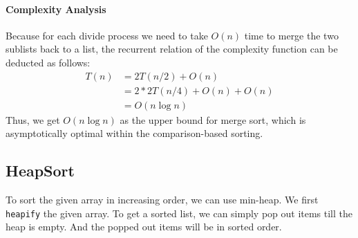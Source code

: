 \documentclass[../main.tex]{subfiles}
\begin{document}
\paragraph{Complexity Analysis} Because for each divide process we need to take $O(n)$ time to merge the two sublists back to a list, the recurrent relation of the complexity function can be deducted as follows: 
\begin{equation} \label{bt_time}
\begin{split}
T(n) & = 2T(n/2) + O(n)\\
 & = 2 * 2T(n/4) + O(n) + O(n)\\
 & = O(n\log n)
\end{split}
\end{equation}
Thus, we get $O(n\log n)$ as the upper bound for merge sort, which is asymptotically optimal within the comparison-based sorting.

\subsection{HeapSort}
\label{sorting_subsec_heapsort}
To sort the given array in increasing order, we can use min-heap. We first \texttt{heapify} the given array. To get a sorted list, we  can simply pop out items till the heap is empty. And the popped out items will be in sorted order. 


\end{document}
